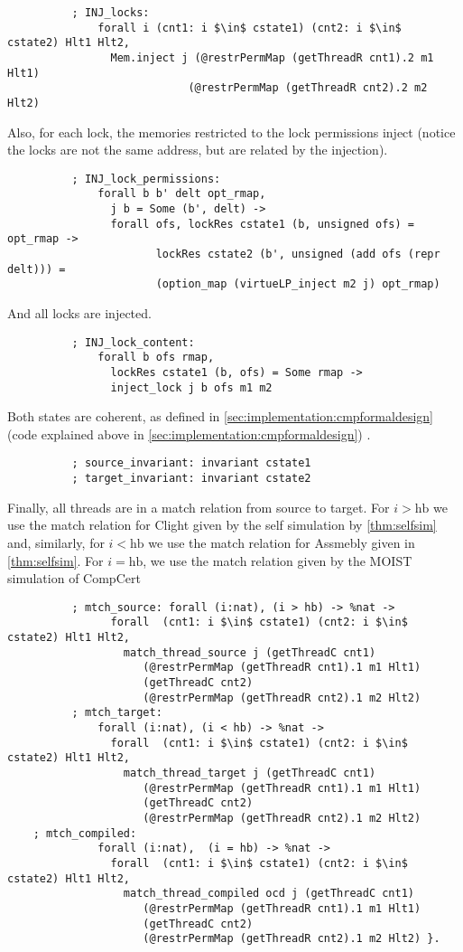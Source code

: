 \begin{lstlisting}
          ; INJ_locks:
              forall i (cnt1: i $\in$ cstate1) (cnt2: i $\in$  cstate2) Hlt1 Hlt2,
                Mem.inject j (@restrPermMap (getThreadR cnt1).2 m1 Hlt1)
                            (@restrPermMap (getThreadR cnt2).2 m2 Hlt2)
\end{lstlisting}     
\noindent Also, for each lock, the memories restricted to the lock permissions inject (notice the locks are not the same address, but are related by the injection).
\begin{lstlisting}
          ; INJ_lock_permissions:
              forall b b' delt opt_rmap,
                j b = Some (b', delt) ->
                forall ofs, lockRes cstate1 (b, unsigned ofs) = opt_rmap ->
                       lockRes cstate2 (b', unsigned (add ofs (repr delt))) =
                       (option_map (virtueLP_inject m2 j) opt_rmap)
\end{lstlisting}     
\noindent And all locks are injected.
\begin{lstlisting}
          ; INJ_lock_content:
              forall b ofs rmap,
                lockRes cstate1 (b, ofs) = Some rmap ->
                inject_lock j b ofs m1 m2    
\end{lstlisting}     
\noindent Both states are coherent, as defined in \cref{sec:implementation:cmpformaldesign} (code explained above in \cref{sec:implementation:cmpformaldesign}) .
\begin{lstlisting}
          ; source_invariant: invariant cstate1    
          ; target_invariant: invariant cstate2
\end{lstlisting}     
\noindent Finally, all threads are in a match relation from source to target. For $i>\text{hb}$ we use the match relation for Clight given by the self simulation by \cref{thm:selfsim} and, 
similarly, for $i<\text{hb}$ we use the match relation for Assmebly given in \cref{thm:selfsim}. For $i=\text{hb}$, we use the match  relation given by the MOIST simulation of CompCert 
\begin{lstlisting}
          ; mtch_source: forall (i:nat), (i > hb) -> %nat ->
                forall  (cnt1: i $\in$ cstate1) (cnt2: i $\in$ cstate2) Hlt1 Hlt2,
                  match_thread_source j (getThreadC cnt1)
				     (@restrPermMap (getThreadR cnt1).1 m1 Hlt1)
				     (getThreadC cnt2)
				     (@restrPermMap (getThreadR cnt2).1 m2 Hlt2)
          ; mtch_target:
              forall (i:nat), (i < hb) -> %nat ->
                forall  (cnt1: i $\in$ cstate1) (cnt2: i $\in$ cstate2) Hlt1 Hlt2,
                  match_thread_target j (getThreadC cnt1)
				     (@restrPermMap (getThreadR cnt1).1 m1 Hlt1)
				     (getThreadC cnt2)
				     (@restrPermMap (getThreadR cnt2).1 m2 Hlt2)       
	; mtch_compiled:
              forall (i:nat),  (i = hb) -> %nat ->
                forall  (cnt1: i $\in$ cstate1) (cnt2: i $\in$ cstate2) Hlt1 Hlt2,
                  match_thread_compiled ocd j (getThreadC cnt1)
				     (@restrPermMap (getThreadR cnt1).1 m1 Hlt1)
				     (getThreadC cnt2)
				     (@restrPermMap (getThreadR cnt2).1 m2 Hlt2) }.
\end{lstlisting}	
